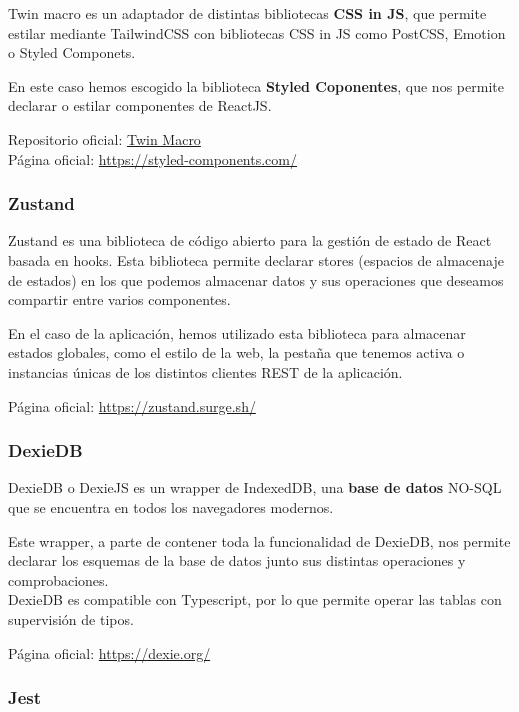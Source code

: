 Twin macro es un adaptador de distintas bibliotecas \textbf{CSS in JS},
que permite estilar mediante TailwindCSS con bibliotecas CSS in JS como
PostCSS, Emotion o Styled Componets.

En este caso hemos escogido la biblioteca \textbf{Styled Coponentes},
que nos permite declarar o estilar componentes de ReactJS.

Repositorio oficial: \href{https://github.com/ben-rogerson/twin.macro}{Twin Macro}\\
Página oficial: \href{https://styled-components.com/}{https://styled-components.com/}

\hypertarget{zustand}{%
\subsubsection{Zustand}\label{zustand}}

Zustand es una biblioteca de código abierto para la gestión de estado de
React basada en hooks. Esta biblioteca permite declarar stores (espacios
de almacenaje de estados) en los que podemos almacenar datos y sus
operaciones que deseamos compartir entre varios componentes.

En el caso de la aplicación, hemos utilizado esta biblioteca para
almacenar estados globales, como el estilo de la web, la pestaña que
tenemos activa o instancias únicas de los distintos clientes REST de la
aplicación.

Página oficial: \href{https://zustand.surge.sh/}{https://zustand.surge.sh/}

\hypertarget{dexiedb}{%
\subsubsection{DexieDB}\label{dexiedb}}

DexieDB o DexieJS es un wrapper de IndexedDB, una \textbf{base de datos} NO-SQL
que se encuentra en todos los navegadores modernos.

Este wrapper, a parte de contener toda la funcionalidad de DexieDB, nos
permite declarar los esquemas de la base de datos junto sus distintas
operaciones y comprobaciones.\\
DexieDB es compatible con Typescript, por lo que permite operar las
tablas con supervisión de tipos.

Página oficial: \href{https://dexie.org/}{https://dexie.org/}

\hypertarget{jest}{%
\subsubsection{Jest}\label{jest}}

